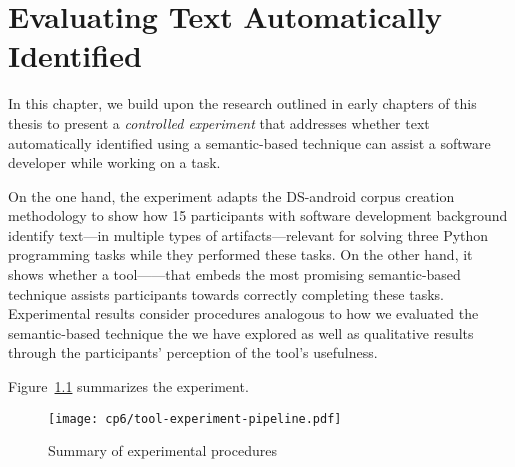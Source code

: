\setcounter{chapter}{5}
\setcounter{rq}{1}


\chapter{Evaluating Text Automatically Identified}
\label{ch:assisting}




In this chapter, we build upon the research outlined in early chapters of this thesis to
present a \textit{controlled experiment} that addresses 
whether  text automatically identified using a semantic-based
technique can assist a software developer while working on a task.



On the one hand, the experiment
adapts the \acs{DS-android} corpus creation methodology to show how 15 participants with software development background identify text---in multiple types of artifacts---relevant for solving three Python programming tasks  while they performed these tasks. On the other hand, 
it shows whether a tool------that embeds the most promising semantic-based technique assists participants towards correctly completing these tasks.
Experimental results consider procedures analogous to how we evaluated the semantic-based technique the we have explored
as well as qualitative results through the participants' perception of the tool's usefulness.



Figure~\ref{fig:tool-experiment-procedures} summarizes the experiment.




\begin{figure}
    \centering
    \texttt{[image: cp6/tool-experiment-pipeline.pdf]}
    \caption{Summary of experimental procedures}
    \label{fig:tool-experiment-procedures}
\end{figure}









